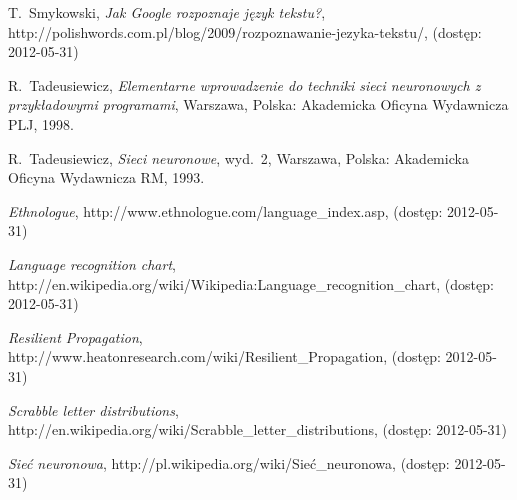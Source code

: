\documentclass[journal]{IEEEtran}
\begin{document}

%
%
%
\begin{thebibliography}{1}

T.~Smykowski, \emph{Jak Google rozpoznaje język tekstu?},
http://polishwords.com.pl/blog/2009/rozpoznawanie-jezyka-tekstu/,
(dostęp: 2012-05-31)

R.~Tadeusiewicz, \emph{Elementarne wprowadzenie do techniki sieci neuronowych
z przykładowymi programami}, Warszawa, Polska: Akademicka Oficyna Wydawnicza PLJ, 1998.

R.~Tadeusiewicz, \emph{Sieci neuronowe}, wyd.~2, Warszawa, Polska: Akademicka
Oficyna Wydawnicza RM, 1993.

\emph{Ethnologue}, http://www.ethnologue.com/language\_index.asp,
(dostęp: 2012-05-31)

\emph{Language recognition chart}, \\ http://en.wikipedia.org/wiki/Wikipedia:Language\_recognition\_chart,
(dostęp: 2012-05-31)

\emph{Resilient Propagation}, \\ http://www.heatonresearch.com/wiki/Resilient\_Propagation,
(dostęp: 2012-05-31)

\emph{Scrabble letter distributions}, \\ http://en.wikipedia.org/wiki/Scrabble\_letter\_distributions,
(dostęp: 2012-05-31)

\emph{Sieć neuronowa}, http://pl.wikipedia.org/wiki/Sieć\_neuronowa,
(dostęp: 2012-05-31)


\end{thebibliography}
\end{document}
